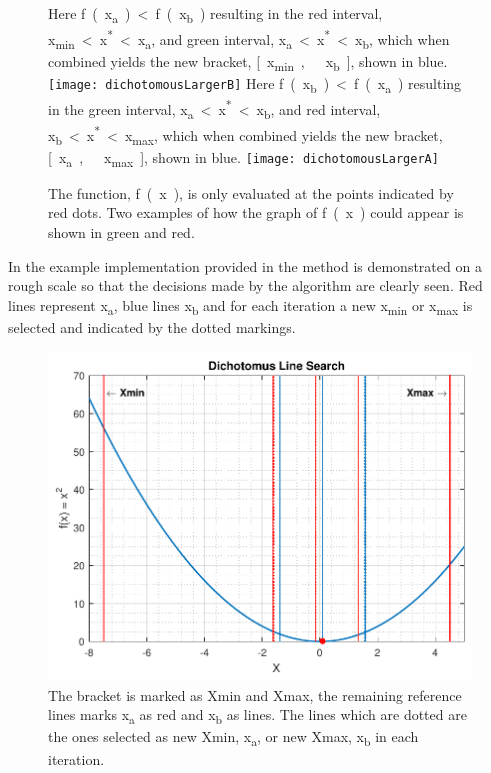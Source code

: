   \begin{figure}[H]
    \begin{minipage}{\linewidth}
      \captionsetup[subfigure]{font = footnotesize}
      \centering
      \subcaptionbox
      {
        Here \si{f(x_a) < f(x_b)} resulting in the red interval, \si{x_{min} < x^* < x_a}, and green interval, \si{x_a < x^* < x_b}, which when combined yields the new bracket, \si{[x_{min},\ x_b]}, shown in blue.
        \label{dichotomousLargerB}
      }
      {
        \texttt{[image: dichotomousLargerB]}
      }\quad
      \subcaptionbox
      {
        Here \si{f(x_b) < f(x_a)} resulting in the green interval, \si{x_a < x^* < x_b}, and red interval, \si{x_b < x^* < x_{max}}, which when combined yields the new bracket, \si{[x_a,\ x_{max}]}, shown in blue.
        \label{dichotomousLargerA}
      }
      {
        \texttt{[image: dichotomousLargerA]}
      }
      \caption{The function, \si{f(x)}, is only evaluated at the points indicated by red dots. Two examples of how the graph of \si{f(x)} could appear is shown in green and red.}
      \label{dichotomousLargerAorB}
    \end{minipage}
  \end{figure}

In the example implementation provided in  the method is demonstrated on a rough scale so that the decisions made by the algorithm are clearly seen. Red lines represent \si{x_a}, blue lines \si{x_b} and for each iteration a new \si{x_{min}} or \si{x_{max}} is selected and indicated by the dotted markings.
%
\begin{figure}[H]
	\centering
	\includegraphics[width=.5\textwidth]{figures/dichotomousLineSearchComprehension.pdf}
	\caption{The bracket is marked as Xmin and Xmax, the remaining reference lines marks \si{x_a} as red and \si{x_b} as lines. The lines which are dotted are the ones selected as new Xmin, \si{x_a}, or new Xmax, \si{x_b} in each iteration.}
	\label{dichotomousLineSearchComprehensive}
\end{figure}